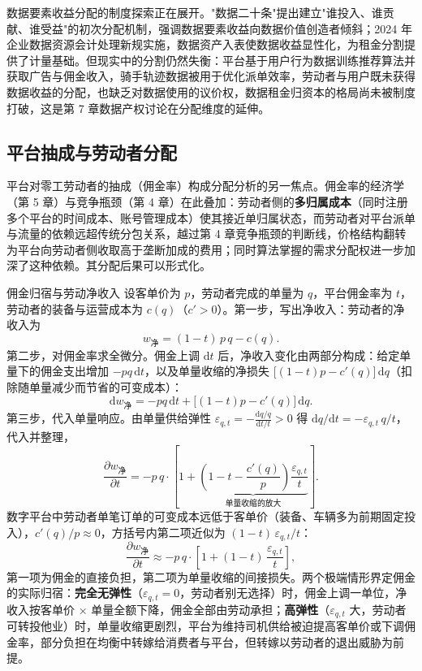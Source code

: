 数据要素收益分配的制度探索正在展开。"数据二十条"提出建立"谁投入、谁贡献、谁受益"的初次分配机制，强调数据要素收益向数据价值创造者倾斜；2024 年企业数据资源会计处理新规实施，数据资产入表使数据收益显性化，为租金分割提供了计量基础。但现实中的分割仍然失衡：平台基于用户行为数据训练推荐算法并获取广告与佣金收入，骑手轨迹数据被用于优化派单效率，劳动者与用户既未获得数据收益的分配，也缺乏对数据使用的议价权，数据租金归资本的格局尚未被制度打破，这是第 7 章数据产权讨论在分配维度的延伸。

\subsection{平台抽成与劳动者分配}

平台对零工劳动者的抽成（佣金率）构成分配分析的另一焦点。佣金率的经济学（第 5 章）与竞争瓶颈（第 4 章）在此叠加：劳动者侧的\textbf{多归属成本}（同时注册多个平台的时间成本、账号管理成本）使其接近单归属状态，而劳动者对平台派单与流量的依赖远超传统分包关系，越过第 4 章竞争瓶颈的判断线，价格结构翻转为平台向劳动者侧收取高于垄断加成的费用；同时算法掌握的需求分配权进一步加深了这种依赖。其分配后果可以形式化。

\begin{derivation}{佣金归宿与劳动净收入}{}
设客单价为 $p$，劳动者完成的单量为 $q$，平台佣金率为 $t$，劳动者的装备与运营成本为 $c(q)$（$c' > 0$）。第一步，写出净收入：劳动者的净收入为
\[
w_{\text{净}} = (1 - t)\, p\, q - c(q).
\]
第二步，对佣金率求全微分。佣金上调 $\mathrm{d}t$ 后，净收入变化由两部分构成：给定单量下的佣金支出增加 $-p q\,\mathrm{d}t$，以及单量收缩的净损失 $\bigl[(1-t)p - c'(q)\bigr]\,\mathrm{d}q$（扣除随单量减少而节省的可变成本）：
\[
\mathrm{d}w_{\text{净}} = -p q\, \mathrm{d}t + \bigl[(1-t)p - c'(q)\bigr]\,\mathrm{d}q.
\]
第三步，代入单量响应。由单量供给弹性 $\varepsilon_{q,t} = -\frac{\mathrm{d}q/q}{\mathrm{d}t/t} > 0$ 得 $\mathrm{d}q/\mathrm{d}t = -\varepsilon_{q,t}\, q/t$，代入并整理，
\[
\frac{\partial w_{\text{净}}}{\partial t} = -p\, q \cdot \left[1 + \underbrace{\left(1 - t - \frac{c'(q)}{p}\right)\frac{\varepsilon_{q,t}}{t}}_{\text{单量收缩的放大}}\right].
\]
数字平台中劳动者单笔订单的可变成本远低于客单价（装备、车辆多为前期固定投入），$c'(q)/p \approx 0$，方括号内第二项近似为 $(1-t)\,\varepsilon_{q,t}/t$：
\[
\frac{\partial w_{\text{净}}}{\partial t} \approx -p\, q \cdot \left[1 + (1-t)\,\frac{\varepsilon_{q,t}}{t}\right],
\]
第一项为佣金的直接负担，第二项为单量收缩的间接损失。两个极端情形界定佣金的实际归宿：\textbf{完全无弹性}（$\varepsilon_{q,t} = 0$，劳动者别无选择）时，佣金上调一单位，净收入按客单价 × 单量全额下降，佣金全部由劳动承担；\textbf{高弹性}（$\varepsilon_{q,t}$ 大，劳动者可转投他业）时，单量收缩更剧烈，平台为维持司机供给被迫提高客单价或下调佣金率，部分负担在均衡中转嫁给消费者与平台，但转嫁以劳动者的退出威胁为前提。
\end{derivation}

